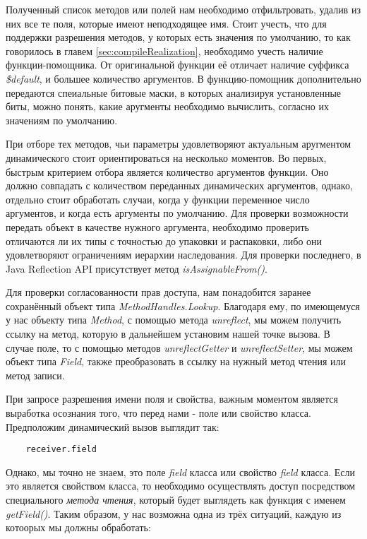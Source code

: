 Полученный список методов или полей нам необходимо отфильтровать, удалив из них все те поля, которые имеют неподходящее имя. Стоит учесть, что для поддержки разрешения методов, у которых есть значения по умолчанию, то как говорилось в главем \ref{sec:compileRealization}, необходимо учесть наличие функции-помощника. От оригинальной функции её отличает наличие суффикса \textit{\$default}, и большее количество аргументов. В функцию-помощник дополнительно передаются спеиальные битовые маски, в которых анализируя установленные биты, можно понять, какие аругменты необходимо вычислить, согласно их значениям по умолчанию.

При отборе тех методов, чьи параметры удовлетворяют актуальным аругментом динамического стоит ориентироваться на несколько моментов. Во первых, быстрым критерием отбора является количество аргументов функции. Оно должно совпадать с количеством переданных динамических аргументов, однако, отдельно стоит обработать случаи, когда у функции переменное число аргументов, и когда есть аргументы по умолчанию. Для проверки возможности передать объект в качестве нужного аргумента, необходимо проверить отличаются ли их типы с точностью до упаковки и распаковки, либо они удовлетворяют ограничениям иерархии наследования. Для проверки последнего, в Java Reflection API присутствует метод \textit{isAssignableFrom()}.

Для проверки согласованности прав доступа, нам понадобится заранее сохранённый объект типа \textit{MethodHandles.Lookup}. Благодаря ему, по имеющемуся у нас объекту типа \textit{Method}, с помощью метода \textit{unreflect}, мы можем получить ссылку на метод, которую в дальнейшем установим нашей точке вызова. В случае поле, то с помощью методов \textit{unreflectGetter} и 
\textit{unreflectSetter}, мы можем объект типа \textit{Field}, также преобразовать в ссылку на нужный метод чтения или метод записи.



При запросе разрешения имени поля и свойства, важным моментом является выработка осознания того, что перед нами - поле или свойство класса. Предположим динамический вызов выглядит так:

\begin{verbatim}
    receiver.field
\end{verbatim}

Однако, мы точно не знаем, это поле \textit{field} класса или свойство \textit{field} класса. Если это является свойством класса, то необходимо осуществлять доступ посредством специального \textit{метода чтения}, который будет выглядеть как функция с именем \textit{getField()}. Таким образом, у нас возможна одна из трёх ситуаций, каждую из котоорых мы должны обработать:

